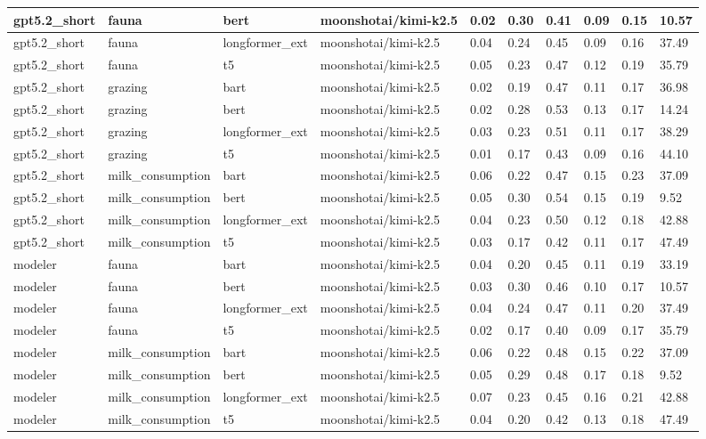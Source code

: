 \begin{tabular}{|l|l|l|l|l|l|l|l|l|l|}
 \hline
 gpt5.2\_short & fauna & bert & moonshotai/kimi-k2.5 & 0.02 & 0.30 & 0.41 & 0.09 & 0.15 & 10.57 \\
 \hline
 gpt5.2\_short & fauna & longformer\_ext & moonshotai/kimi-k2.5 & 0.04 & 0.24 & 0.45 & 0.09 & 0.16 & 37.49 \\
 \hline
 gpt5.2\_short & fauna & t5 & moonshotai/kimi-k2.5 & 0.05 & 0.23 & 0.47 & 0.12 & 0.19 & 35.79 \\
 \hline
 gpt5.2\_short & grazing & bart & moonshotai/kimi-k2.5 & 0.02 & 0.19 & 0.47 & 0.11 & 0.17 & 36.98 \\
 \hline
 gpt5.2\_short & grazing & bert & moonshotai/kimi-k2.5 & 0.02 & 0.28 & 0.53 & 0.13 & 0.17 & 14.24 \\
 \hline
 gpt5.2\_short & grazing & longformer\_ext & moonshotai/kimi-k2.5 & 0.03 & 0.23 & 0.51 & 0.11 & 0.17 & 38.29 \\
 \hline
 gpt5.2\_short & grazing & t5 & moonshotai/kimi-k2.5 & 0.01 & 0.17 & 0.43 & 0.09 & 0.16 & 44.10 \\
 \hline
 gpt5.2\_short & milk\_consumption & bart & moonshotai/kimi-k2.5 & 0.06 & 0.22 & 0.47 & 0.15 & 0.23 & 37.09 \\
 \hline
 gpt5.2\_short & milk\_consumption & bert & moonshotai/kimi-k2.5 & 0.05 & 0.30 & 0.54 & 0.15 & 0.19 & 9.52 \\
 \hline
 gpt5.2\_short & milk\_consumption & longformer\_ext & moonshotai/kimi-k2.5 & 0.04 & 0.23 & 0.50 & 0.12 & 0.18 & 42.88 \\
 \hline
 gpt5.2\_short & milk\_consumption & t5 & moonshotai/kimi-k2.5 & 0.03 & 0.17 & 0.42 & 0.11 & 0.17 & 47.49 \\
 \hline
 modeler & fauna & bart & moonshotai/kimi-k2.5 & 0.04 & 0.20 & 0.45 & 0.11 & 0.19 & 33.19 \\
 \hline
 modeler & fauna & bert & moonshotai/kimi-k2.5 & 0.03 & 0.30 & 0.46 & 0.10 & 0.17 & 10.57 \\
 \hline
 modeler & fauna & longformer\_ext & moonshotai/kimi-k2.5 & 0.04 & 0.24 & 0.47 & 0.11 & 0.20 & 37.49 \\
 \hline
 modeler & fauna & t5 & moonshotai/kimi-k2.5 & 0.02 & 0.17 & 0.40 & 0.09 & 0.17 & 35.79 \\
 \hline
 modeler & milk\_consumption & bart & moonshotai/kimi-k2.5 & 0.06 & 0.22 & 0.48 & 0.15 & 0.22 & 37.09 \\
 \hline
 modeler & milk\_consumption & bert & moonshotai/kimi-k2.5 & 0.05 & 0.29 & 0.48 & 0.17 & 0.18 & 9.52 \\
 \hline
 modeler & milk\_consumption & longformer\_ext & moonshotai/kimi-k2.5 & 0.07 & 0.23 & 0.45 & 0.16 & 0.21 & 42.88 \\
 \hline
 modeler & milk\_consumption & t5 & moonshotai/kimi-k2.5 & 0.04 & 0.20 & 0.42 & 0.13 & 0.18 & 47.49 \\
\hline
\end{tabular}
